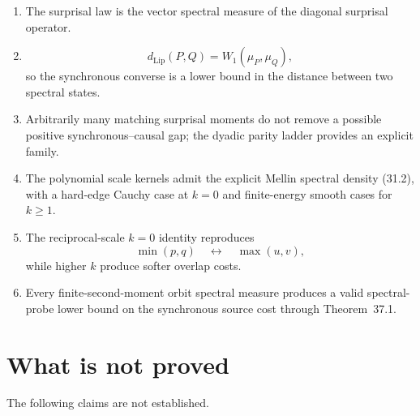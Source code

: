 \documentclass[11pt,a4paper]{article}
\newcommand{\1}{\mathbf 1}
\begin{document}
\begin{enumerate}[leftmargin=8mm]
\item The surprisal law is the vector spectral measure of the diagonal
surprisal operator.

\item
\[
d_{\mathrm{Lip}}(P,Q)=W_1(\mu_P,\mu_Q),
\]
so the synchronous converse is a lower bound in the distance between
two spectral states.

\item Arbitrarily many matching surprisal moments do not remove a
possible positive synchronous--causal gap; the dyadic parity ladder
provides an explicit family.

\item The polynomial scale kernels admit the explicit Mellin spectral
density (31.2), with a hard-edge Cauchy case at \(k=0\) and
finite-energy smooth cases for \(k\ge1\).

\item The reciprocal-scale \(k=0\) identity reproduces
\[
\min(p,q)
\quad\leftrightarrow\quad
\max(u,v),
\]
while higher \(k\) produce softer overlap costs.

\item Every finite-second-moment orbit spectral measure produces a valid
spectral-probe lower bound on the synchronous source cost through
Theorem~37.1.

\end{enumerate}


\section{What is not proved}

The following claims are not established.
\end{document}
